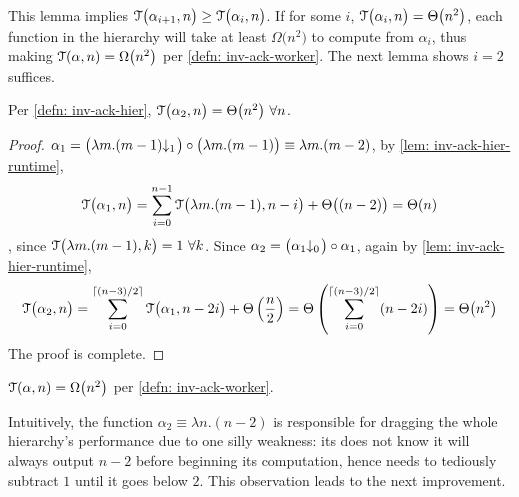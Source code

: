 This lemma implies $\mathcal{T}\big(\alpha_{i+1}, n\big) \ge \mathcal{T}\big(\alpha_i, n\big)$. If for some $i$, $\mathcal{T}\big(\alpha_i, n\big) = \Theta\big(n^2\big)$, each function in the hierarchy will take at least $\Omega\big(n^2\big)$ to compute from $\alpha_i$, thus making $\mathcal{T}(\alpha, n) = \Omega\big(n^2\big)$ per \cref{defn: inv-ack-worker}. The next lemma shows $i = 2$ suffices.
\begin{lem}
	Per \cref{defn: inv-ack-hier}, $\mathcal{T}\big(\alpha_2, n\big) = \Theta\big(n^2\big) \ \forall n$. 
\end{lem}
\begin{proof}
	$\alpha_1 = \big(\cdt{\lambda m.(m-1)}{1}\big)\circ \big(\lambda m.(m-1)\big) \equiv \lambda m.(m - 2)$, by \cref{lem: inv-ack-hier-runtime},
	\begin{equation*}
	\mathcal{T}\big(\alpha_1, n\big) = \sum_{i=0}^{n-1} \mathcal{T}\big(\lambda m.(m-1), n - i\big) + \Theta\big((n-2)\big) = \Theta(n)
	\end{equation*}
	, since $\mathcal{T}\big(\lambda m.(m-1), k\big) = 1 \ \forall k$. Since $\alpha_2 = \big(\cdt{\alpha_1}{0}\big)\circ \alpha_1 $, again by \cref{lem: inv-ack-hier-runtime},
	\begin{equation*}
	\mathcal{T}\big(\alpha_2, n\big)
	= \sum_{i=0}^{\lceil (n-3)/2 \rceil} \mathcal{T} \big(\alpha_1, n-2i\big) + \Theta\left(\frac{n}{2}\right)
	= \Theta\left( \sum_{i=0}^{\lceil (n-3)/2 \rceil}(n - 2i) \right)
	= \Theta\big(n^2\big)
	\end{equation*}
	The proof is complete.
\end{proof}
\begin{col}
	$\mathcal{T}(\alpha, n) = \Omega\big(n^2\big)$ per \cref{defn: inv-ack-worker}.
\end{col}
Intuitively, the function $\alpha_2 \equiv \lambda n.(n-2)$ is responsible for dragging the whole hierarchy's performance due to one silly weakness: its does not know it will always output $n-2$ before beginning its computation, hence needs to tediously subtract $1$ until it goes below $2$. This observation leads to the next improvement.

